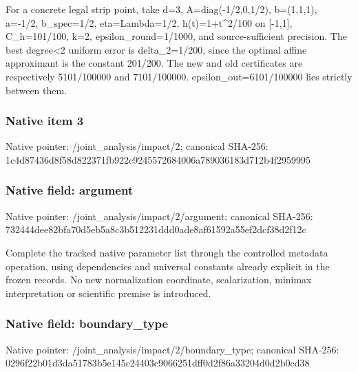 \documentclass[10pt,a4paper]{article}
\begin{document}
\begingroup\raggedright\sloppy For a concrete legal strip point,\allowbreak{} take d=\allowbreak{}3,\allowbreak{} A=\allowbreak{}diag(-1/\allowbreak{}2,\allowbreak{}0,\allowbreak{}1/\allowbreak{}2),\allowbreak{} b=\allowbreak{}(1,\allowbreak{}1,\allowbreak{}1),\allowbreak{} a=\allowbreak{}-1/\allowbreak{}2,\allowbreak{} b\_\allowbreak{}spec=\allowbreak{}1/\allowbreak{}2,\allowbreak{} eta=\allowbreak{}Lambda=\allowbreak{}1/\allowbreak{}2,\allowbreak{} h(t)=\allowbreak{}1+t\textasciicircum{}2/\allowbreak{}100 on [-1,\allowbreak{}1],\allowbreak{} C\_\allowbreak{}h=\allowbreak{}101/\allowbreak{}100,\allowbreak{} k=\allowbreak{}2,\allowbreak{} epsilon\_\allowbreak{}round=\allowbreak{}1/\allowbreak{}1000,\allowbreak{} and source-sufficient precision. The best degree<2 uniform error is delta\_\allowbreak{}2=\allowbreak{}1/\allowbreak{}200,\allowbreak{} since the optimal affine approximant is the constant 201/\allowbreak{}200. The new and old certificates are respectively 5101/\allowbreak{}100000 and 7101/\allowbreak{}100000. epsilon\_\allowbreak{}out=\allowbreak{}6101/\allowbreak{}100000 lies strictly between them.\par\endgroup

\subsubsection{Native item 3}
Native pointer: /joint\_\allowbreak{}analysis/impact/2; canonical SHA-256: 1c4d87436d8f58d822371fb922c9245572684006a789036183d712b4f2959995

\subsubsection{Native field: argument}
Native pointer: /joint\_\allowbreak{}analysis/impact/2/argument; canonical SHA-256: 732444dee82bfa70d5eb5a8c3b512231ddd0ade8af61592a55ef2dcf38d2f12c

\begingroup\raggedright\sloppy Complete the tracked native parameter list through the controlled metadata operation,\allowbreak{} using dependencies and universal constants already explicit in the frozen records. No new normalization coordinate,\allowbreak{} scalarization,\allowbreak{} minimax interpretation or scientific premise is introduced.\par\endgroup

\subsubsection{Native field: boundary\_\allowbreak{}type}
Native pointer: /joint\_\allowbreak{}analysis/impact/2/boundary\_\allowbreak{}type; canonical SHA-256: 0296f22b01d3da51783b5e145c24403c9066251dff0d2f86a33204d0d2b0cd38
\end{document}
